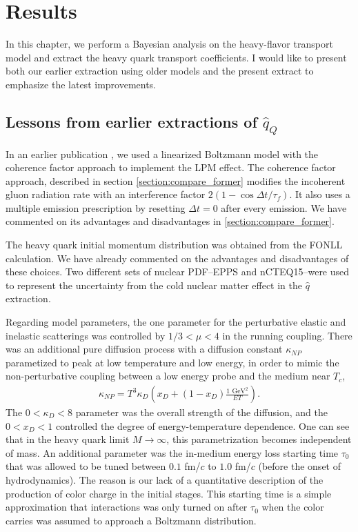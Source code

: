 \chapter{Results}
\label{chapter:results}
In this chapter, we perform a Bayesian analysis on the heavy-flavor transport model and extract the heavy quark transport coefficients.
I would like to present both our earlier extraction using older models and the present extract to emphasize the latest improvements.

\section{Lessons from earlier extractions of $\hat{q}_Q$}
In an earlier publication \cite{Ke:2018tsh}, we used a linearized Boltzmann model with the coherence factor approach to implement the LPM effect.
The coherence factor approach, described in section  \ref{section:compare_former} modifies the incoherent gluon radiation rate with an interference factor $2(1-\cos\Delta t/\tau_f)$. 
It also uses a multiple emission prescription by resetting $\Delta t=0$ after every emission.
We have commented on its advantages and disadvantages in \ref{section:compare_former}.

The heavy quark initial momentum distribution was obtained from the FONLL calculation.
We have already commented on the advantages and disadvantages of these choices.
Two different sets of nuclear PDF--EPPS and nCTEQ15--were used to represent the uncertainty from the cold nuclear matter effect in the $\hat{q}$ extraction.

Regarding model parameters, the one parameter for the perturbative elastic and inelastic scatterings was controlled by $1/3 < \mu < 4$ in the running coupling. 
There was an additional pure diffusion process with a diffusion constant $\kappa_{NP}$ parametized to peak at low temperature and low energy, in order to mimic the non-perturbative coupling between a low energy probe and the medium near $T_c$,
\begin{eqnarray}
\kappa_{NP} = T^3 \kappa_D \left(x_D + (1-x_D)\frac{1\textrm{ GeV}{}^2}{ET}\right).
\end{eqnarray}
The $0<\kappa_D<8$ parameter was the overall strength of the diffusion, and the $0<x_D<1$ controlled the degree of energy-temperature dependence.
One can see that in the heavy quark limit $M\rightarrow \infty$, this parametrization becomes independent of mass.
An additional parameter was the in-medium energy loss starting time $\tau_0$ that was allowed to be tuned between $0.1$ fm/$c$ to $1.0$ fm/$c$ (before the onset of hydrodynamics).
The reason is our lack of a quantitative description of the production of color charge in the initial stages.
This starting time is a simple approximation that interactions was only turned on after $\tau_0$ when the color carries was assumed to approach a Boltzmann distribution.

